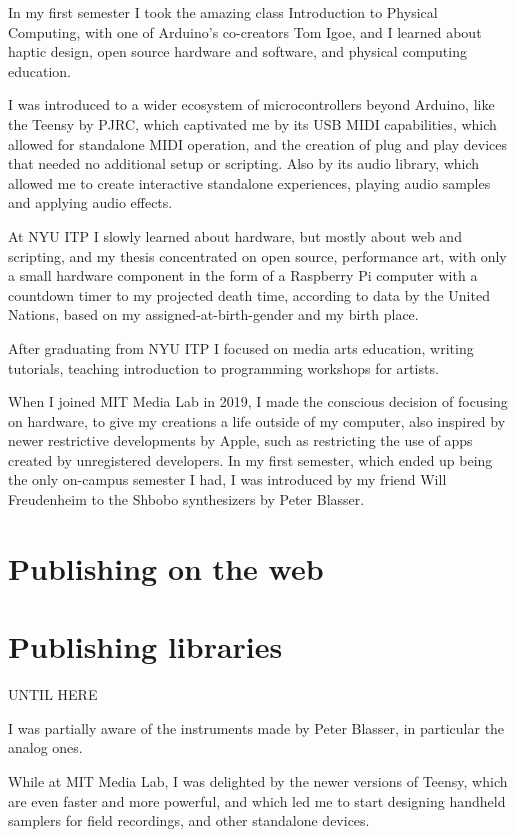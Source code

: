 In my first semester I took the amazing class Introduction to Physical Computing, with one of Arduino's co-creators Tom Igoe, and I learned about haptic design, open source hardware and software, and physical computing education.

I was introduced to a wider ecosystem of microcontrollers beyond Arduino, like the Teensy by PJRC, which captivated me by its USB MIDI capabilities, which allowed for standalone MIDI operation, and the creation of plug and play devices that needed no additional setup or scripting. Also by its audio library, which allowed me to create interactive standalone experiences, playing audio samples and applying audio effects.

At NYU ITP I slowly learned about hardware,  but mostly about web and scripting, and my thesis concentrated on open source, performance art, with only a small hardware component in the form of a Raspberry Pi computer with a countdown timer to my projected death time, according to data by the United Nations, based on my assigned-at-birth-gender and my birth place.

After graduating from NYU ITP I focused on media arts education, writing tutorials, teaching introduction to programming workshops for artists.

When I joined MIT Media Lab in 2019, I made the conscious decision of focusing on hardware, to give my creations a life outside of my computer, also inspired by newer restrictive developments by Apple, such as restricting the use of apps created by unregistered developers. In my first semester, which ended up being the only on-campus semester I had, I was introduced by my friend Will Freudenheim to the Shbobo synthesizers by Peter Blasser.

\section{Publishing on the web}

\section{Publishing libraries}

UNTIL HERE

I was partially aware of the instruments made by Peter Blasser, in particular the analog ones.

While at MIT Media Lab, I was delighted by the newer versions of Teensy, which are even faster and more powerful, and which led me to start designing handheld samplers for field recordings, and other standalone devices.

